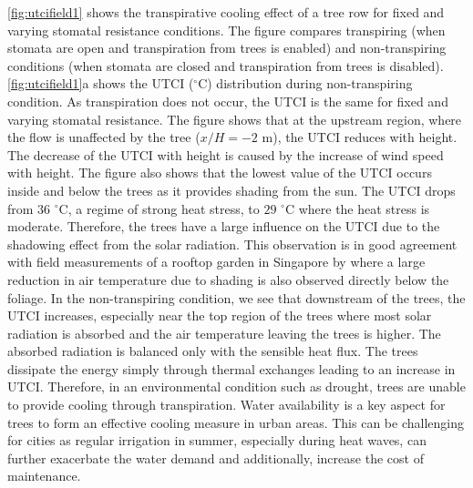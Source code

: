 \cref{fig:utcifield1} shows the transpirative cooling effect of a tree row for fixed and varying stomatal resistance conditions. The figure compares transpiring (when stomata are open and transpiration from trees is enabled) and non-transpiring conditions (when stomata are closed and transpiration from trees is disabled). \cref{fig:utcifield1}a shows the UTCI ($^{\circ}$C) distribution during non-transpiring condition. As transpiration does not occur, the UTCI is the same for fixed and varying stomatal resistance. The figure shows that at the upstream region, where the flow is unaffected by the tree ($x/H=-2$ m), the UTCI reduces with height. The decrease of the UTCI with height is caused by the increase of wind speed with height. The figure also shows that the lowest value of the UTCI occurs inside and below the trees as it provides shading from the sun. The UTCI drops from $36$ $^{\circ}$C, a regime of strong heat stress, to $29$ $^{\circ}$C where the heat stress is moderate. Therefore, the trees have a large influence on the UTCI due to the shadowing effect from the solar radiation. This observation is in good agreement with field measurements of a rooftop garden in Singapore by \cite{Wong2003} where a large reduction in air temperature due to shading is also observed directly below the foliage. In the non-transpiring condition, we see that downstream of the trees, the UTCI increases, especially near the top region of the trees where most solar radiation is absorbed and the air temperature leaving the trees is higher. The absorbed radiation is balanced only with the sensible heat flux. The trees dissipate the energy simply through thermal exchanges leading to an increase in UTCI. Therefore, in an environmental condition such as drought, trees are unable to provide cooling through transpiration. Water availability is a key aspect for trees to form an effective cooling measure in urban areas. This can be challenging for cities as regular irrigation in summer, especially during heat waves, can further exacerbate the water demand and additionally, increase the cost of maintenance. 

